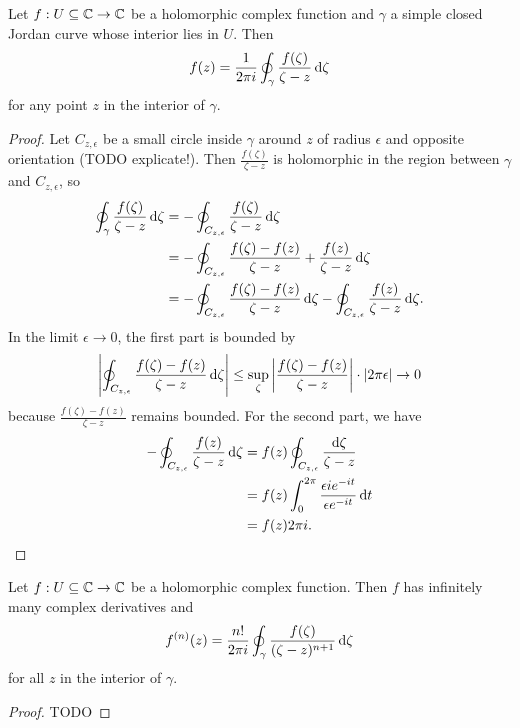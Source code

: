 \begin{theorem}
Let $f: U\subseteq \mathbb{C} \to \mathbb{C}$ be a holomorphic complex function and $\gamma$ a simple closed Jordan curve whose interior lies in $U$. Then
\[ f(z) = \frac{1}{2\pi i}\oint_\gamma \frac{f(\zeta)}{\zeta - z}\operatorname{d \!}{\zeta} \]
for any point $z$ in the interior of $\gamma$.
\end{theorem}
\begin{proof}
Let $C_{z,\epsilon}$ be a small circle inside $\gamma$ around $z$ of radius $\epsilon$ and opposite orientation (TODO explicate!). Then $\frac{f(\zeta)}{\zeta - z}$ is holomorphic in the region between $\gamma$ and $C_{z,\epsilon}$, so
\begin{align*}
\oint_\gamma \frac{f(\zeta)}{\zeta - z}\operatorname{d \!}{\zeta} &= -\oint_{C_{z,\epsilon}} \frac{f(\zeta)}{\zeta - z}\operatorname{d \!}{\zeta} \\
&= -\oint_{C_{z,\epsilon}} \frac{f(\zeta)-f(z)}{\zeta - z} + \frac{f(z)}{\zeta - z}\operatorname{d \!}{\zeta} \\
&= -\oint_{C_{z,\epsilon}} \frac{f(\zeta)-f(z)}{\zeta - z}\operatorname{d \!}{\zeta} -\oint_{C_{z,\epsilon}}\frac{f(z)}{\zeta - z}\operatorname{d \!}{\zeta}.
\end{align*}
In the limit $\epsilon \to 0$, the first part is bounded by
\[ \left|\oint_{C_{z,\epsilon}} \frac{f(\zeta)-f(z)}{\zeta - z}\operatorname{d \!}{\zeta}\right| \leq \sup_\zeta\left|\frac{f(\zeta)-f(z)}{\zeta - z}\right| \cdot |2\pi\epsilon| \to 0 \]
because $\frac{f(\zeta)-f(z)}{\zeta - z}$ remains bounded. For the second part, we have
\begin{align*}
-\oint_{C_{z,\epsilon}} \frac{f(z)}{\zeta - z}\operatorname{d \!}{\zeta} &= f(z)\oint_{C_{z,\epsilon}} \frac{\operatorname{d \!}{\zeta}}{\zeta - z} \\
&= f(z)\int_0^{2\pi}\frac{\epsilon ie^{-it}}{\epsilon e^{-it}}\operatorname{d \!}{t} \\
&= f(z)2\pi i.
\end{align*}
\end{proof}
\begin{corollary}
Let $f: U\subseteq \mathbb{C} \to \mathbb{C}$ be a holomorphic complex function. Then $f$ has infinitely many complex derivatives and
\[ f^{(n)}(z) = \frac{n!}{2\pi i}\oint_\gamma \frac{f(\zeta)}{(\zeta-z)^{n+1}}\operatorname{d \!}{\zeta} \]
for all $z$ in the interior of $\gamma$.
\end{corollary}
\begin{proof}
TODO
\end{proof}

